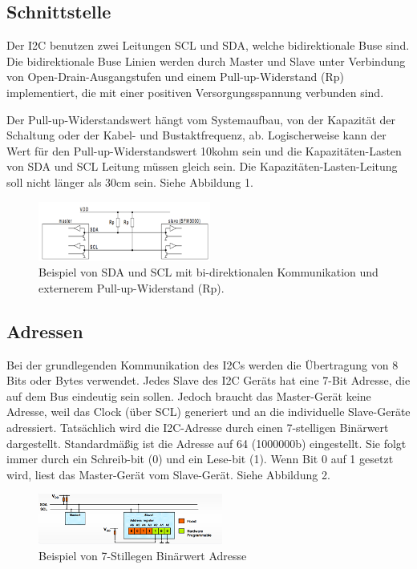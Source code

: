 \documentclass[conference]{IEEEtran}
\begin{document}
\subsection{Schnittstelle}
Der I2C benutzen zwei Leitungen SCL und SDA, welche bidirektionale Buse sind. Die bidirektionale Buse Linien werden durch Master und Slave unter Verbindung von Open-Drain-Ausgangstufen und einem Pull-up-Widerstand (Rp) implementiert, die mit einer positiven Versorgungsspannung verbunden sind.

Der Pull-up-Widerstandswert hängt vom Systemaufbau, von der Kapazität der Schaltung oder der Kabel- und Bustaktfrequenz, ab. Logischerweise kann der Wert für den Pull-up-Widerstandswert 10kohm sein und die Kapazitäten-Lasten von SDA und SCL Leitung müssen gleich sein. Die Kapazitäten-Lasten-Leitung soll nicht länger als 30cm sein.  Siehe Abbildung 1.

\begin{figure}[h]
	\centering
	\includegraphics[width=0.7\linewidth]{fig9}
	\caption{Beispiel von SDA und SCL mit bi-direktionalen Kommunikation und externerem Pull-up-Widerstand (Rp).}
	\label{fig:fig9}
\end{figure}


\subsection{Adressen}

Bei  der grundlegenden Kommunikation des I2Cs werden die Übertragung von 8 Bits oder Bytes verwendet. Jedes Slave des I2C Geräts hat eine 7-Bit Adresse, die auf dem Bus eindeutig sein sollen. Jedoch braucht das Master-Gerät keine Adresse, weil das Clock (über SCL) generiert und an die individuelle Slave-Geräte adressiert. 
Tatsächlich  wird die I2C-Adresse durch einen 7-stelligen Binärwert dargestellt. Standardmäßig ist die Adresse auf 64 (1000000b) eingestellt. Sie folgt immer durch ein Schreib-bit (0) und ein Lese-bit (1). Wenn Bit 0 auf 1 gesetzt wird, liest das Master-Gerät vom Slave-Gerät. 
Siehe Abbildung 2.

\begin{figure}[h]
	\centering
	\includegraphics[width=0.7\linewidth]{fig10}
	\caption{Beispiel von 7-Stillegen Binärwert Adresse}
	\label{fig:fig10}
\end{figure}
\end{document}
